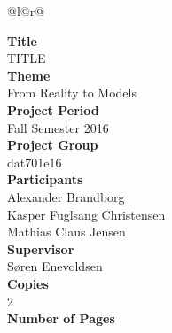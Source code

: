 
\begin{nopagebreak}
{\begin{center}
    \begin{tabular*}{\textwidth}{@{}l@{\extracolsep{\fill}}r@{}}
        \\
        \begin{minipage}[t]{0.49\textwidth}
            \textbf{Title}\\
            TITLE\\

            \textbf{Theme}\\
            From Reality to Models\\

            \textbf{Project Period}\\
            Fall Semester 2016\\

            \textbf{Project Group}\\
            dat701e16\\

            \textbf{Participants}\\
            Alexander Brandborg\\
            Kasper Fuglsang Christensen\\
            Mathias Claus Jensen\\

            \textbf{Supervisor}\\
            Søren Enevoldsen\\

            \textbf{Copies}\\
            2\\ %

            \textbf{Number of Pages}\\
            \pageref{LastPage}\\


\end{minipage}
\end{tabular*}
\end{center}}
\end{nopagebreak}
